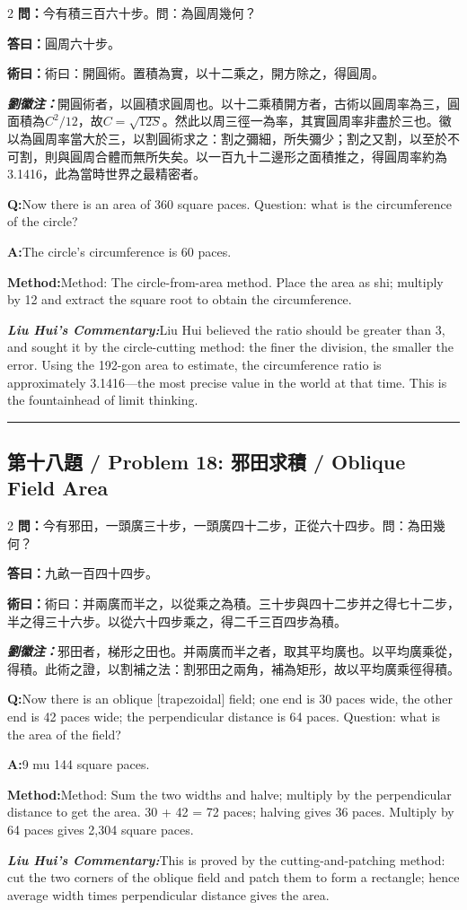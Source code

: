 \documentclass[11pt,a4paper]{article}
\newcommand{\cnwen}{\textcolor{cnlabelfg}{\textbf{問：}}}
\newcommand{\cnda}{\textbf{答曰：}}
\newcommand{\cnshu}{\textcolor{cnlabelfg}{\textbf{術曰：}}}
\newcommand{\cnzhu}{\textcolor{commentarycolor}{\textit{\textbf{劉徽注：}}}}
\newcommand{\enwen}{\textcolor{enlabelfg}{\textbf{Q:}}}
\newcommand{\enda}{\textcolor{enlabelfg}{\textbf{A:}}}
\newcommand{\enshu}{\textcolor{enlabelfg}{\textbf{Method:}}}
\newcommand{\enzhu}{\textcolor{enlabelfg}{\textit{\textbf{Liu Hui's Commentary:}}}}
\begin{document}
\begin{paracol}{2}
\switchcolumn[0]
\cnwen 今有積三百六十步。問：為圓周幾何？

\cnda 圓周六十步。

\cnshu 術曰：開圓術。置積為實，以十二乘之，開方除之，得圓周。

\cnzhu 開圓術者，以圓積求圓周也。以十二乘積開方者，古術以圓周率為三，圓面積為$C^2/12$，故$C = \sqrt{{12S}}$。然此以周三徑一為率，其實圓周率非盡於三也。徽以為圓周率當大於三，以割圓術求之：割之彌細，所失彌少；割之又割，以至於不可割，則與圓周合體而無所失矣。以一百九十二邊形之面積推之，得圓周率約為3.1416，此為當時世界之最精密者。

\switchcolumn[1]
\enwen Now there is an area of 360 square paces. Question: what is the circumference of the circle?

\enda The circle's circumference is 60 paces.

\enshu Method: The circle-from-area method. Place the area as shi; multiply by 12 and extract the square root to obtain the circumference.

\enzhu Liu Hui believed the ratio should be greater than 3, and sought it by the circle-cutting method: the finer the division, the smaller the error. Using the 192-gon area to estimate, the circumference ratio is approximately 3.1416---the most precise value in the world at that time. This is the fountainhead of limit thinking.
\end{paracol}

\bigskip\hrule\bigskip

\subsection{第十八題 / Problem 18: 邪田求積 / Oblique Field Area}

\begin{paracol}{2}
\switchcolumn[0]
\cnwen 今有邪田，一頭廣三十步，一頭廣四十二步，正從六十四步。問：為田幾何？

\cnda 九畝一百四十四步。

\cnshu 術曰：并兩廣而半之，以從乘之為積。三十步與四十二步并之得七十二步，半之得三十六步。以從六十四步乘之，得二千三百四步為積。

\cnzhu 邪田者，梯形之田也。并兩廣而半之者，取其平均廣也。以平均廣乘從，得積。此術之證，以割補之法：割邪田之兩角，補為矩形，故以平均廣乘徑得積。

\switchcolumn[1]
\enwen Now there is an oblique [trapezoidal] field; one end is 30 paces wide, the other end is 42 paces wide; the perpendicular distance is 64 paces. Question: what is the area of the field?

\enda 9 mu 144 square paces.

\enshu Method: Sum the two widths and halve; multiply by the perpendicular distance to get the area. 30 + 42 = 72 paces; halving gives 36 paces. Multiply by 64 paces gives 2,304 square paces.

\enzhu This is proved by the cutting-and-patching method: cut the two corners of the oblique field and patch them to form a rectangle; hence average width times perpendicular distance gives the area.
\end{paracol}
\end{document}
